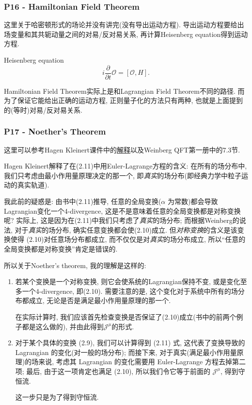 \documentclass[cn,hazy,blue,11pt,device=normal,chinesefont=founder]{elegantnote}
\begin{document}
\subsubsection{P16 - Hamiltonian Field Theorem}

这里关于哈密顿形式的场论并没有讲完(没有导出运动方程). 导出运动方程要给出场变量和其共轭动量之间的对易/反对易关系, 再计算Heisenberg equation得到运动方程. 

\begin{note}
  Heisenberg equation
  \begin{equation}
    i\frac{\partial}{\partial t}\mathcal{O} = [\mathcal{O}, H].
  \end{equation}
\end{note}

Hamiltonian Field Theorem实际上是和Lagrangian Field Theorem不同的路径. 而为了保证它能给出正确的运动方程, 正则量子化的方法只有两种, 也就是上面提到的(等时)对易/反对易关系. 

\subsubsection{P17 - Noether's Theorem}

这里可以参考Hagen Kleinert课件中的\href{http://users.physik.fu-berlin.de/~kleinert/b6/psfiles/Chapter-7-conslaw.pdf}{解释}以及Weinberg QFT第一册中的7.3节. 

Hagen Kleinert解释了在(2.11)中用Euler-Lagrange方程的含义: 在所有的场分布中, 我们只考虑由最小作用量原理决定的那一个, 即\textit{真实}的场分布(即经典力学中粒子运动的真实轨道). 

我此前的疑惑是: 由书中(2.11)推导, 任意的全局变换($\alpha$ 为常数)都会导致Lagrangian变化一个4-divergence, 这是不是意味着任意的全局变换都是对称变换呢? 实际上, 这是因为在(2.11)中我们只考虑了\textit{真实}的场分布; 而根据Weinberg的说法, 对于\textit{真实}的场分布, 确实任意变换都会使(2.10)成立. 但\textit{对称变换}的含义是该变换使得 (2.10)对任意场分布都成立, 而不仅仅是对\textit{真实}的场分布成立, 所以“任意的全局变换都是对称变换”肯定是错误的. 

所以关于Noether's theorem, 我的理解是这样的: 

\begin{enumerate}
  \item 若某个变换是一个对称变换, 则它会使系统的Lagrangian保持不变, 或是变化至多一个4-divergence, 即(2.10). 需要注意的是, 这个变化对于系统中所有的场分布都成立, 无论是否是满足最小作用量原理的那一个. 
  \begin{remark}
    在实际计算时, 我们应该首先检查变换是否保证了(2.10)成立(书中的前两个例子都是这么做的), 并由此得到$\mathcal{J}^{\mu}$的形式. 
  \end{remark}
  \item 对于某个具体的变换 (2.9), 我们可以计算得到 (2.11) 式, 这代表了变换导致的 Lagrangian 的变化(对一般的场分布); 而接下来, 对于真实(满足最小作用量原理)的场来说, 考虑其 Lagrangian 的变化需要用 Euler-Lagrange 方程去掉第二项; 最后, 由于这一项肯定也满足 (2.10), 所以我们令它等于前面的 $\mathcal{J}^{\mu}$, 得到守恒流. 
  \begin{remark}
    这一步只是为了得到守恒流. 
  \end{remark}
\end{enumerate}
\end{document}
